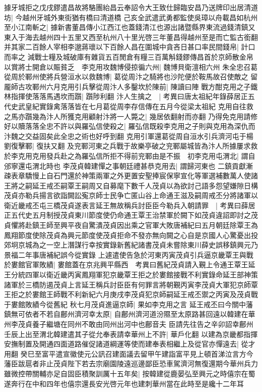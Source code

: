 據牙城拒之戊戌鏐遣昌故將駱團紿昌云奉詔令大王致仕歸臨安昌乃送牌印出居清道坊|{
	今越州牙城外東街猶有橋曰清道橋}
己亥全武遣武勇都監使吳璋以舟載昌如杭州至小江南斬之|{
	據新書董昌傳小江西江也蓋錢清江也源出諸暨縣界東流過錢清鎮又東入于海去越州四十五里又西至杭州八十里光啓三年董昌得越州至是而亡監古銜翻}
并其家二百餘人宰相李邈蔣瓌以下百餘人昌在圍城中貪吝日甚口率民間錢帛|{
	計口而率之}
減戰士糧及城破庫有雜貨五百閒倉有糧三百萬斛錢鏐傳昌首於京師散金帛以賞將士開倉以賑貧乏　李克用攻魏博侵掠徧六州|{
	魏博貝衛澶相六州}
朱全忠召葛從周於鄆州使將兵營洹水以救魏博|{
	葛從周汴之騎將也沙陀便於鞍馬故召使敵之}
留龎師古攻鄆州六月克用引兵擊從周汴人多鑿坎於陳前|{
	陳讀曰陣}
戰方酣克用之子鐵林指揮使落落馬遇坎而躓|{
	躓陟利翻}
汴人生擒之　|{
	考異曰唐太祖紀年錄薛居正五代史武皇紀實錄禽落落皆在七月葛從周李存信傳在五月今從梁太祖紀}
克用自往救之馬亦躓幾為汴人所獲克用顧射汴將一人斃之|{
	幾居依翻射而亦翻}
乃得免克用請修好以贖落落全忠不許以與羅弘信使殺之|{
	羅弘信既殺李克用之子則與克用為深仇而汴魏之交益固矣此全忠之術也好呼到翻}
克用引軍還葛從周自洹水引兵濟河屯于楊劉復擊鄆|{
	復扶又翻}
及兖鄆河東之兵戰于故樂亭破之兖鄆屬城皆為汴人所據屢求救於李克用克用發兵赴之為羅弘信所拒不得前兖鄆由是不振　初李克用屯渭北|{
	謂自邠寧還屯渭北時也}
李茂貞韓建憚之事朝廷禮甚恭克用去|{
	謂歸河東也}
二鎮貢獻漸疎表章驕慢上自石門還於神策兩軍之外更置安聖捧宸保寧宣化等軍選補數萬人使諸王將之嗣延王戒丕嗣覃王嗣周又自募麾下數千人茂貞以為欲討己語多怨望嫌隙日構茂貞亦勒兵揚言欲詣闕訟寃京師士民争亡匿山谷上命通王滋及嗣周戒丕分將諸軍以衛近畿戒丕屯三橋茂貞遂表言延王無故稱兵討臣臣今勒兵入朝請罪　|{
	考異曰薛居正五代史五月制授茂貞東川節度使仍命通王覃王治禁軍於闕下如茂貞違詔即討之茂貞懼將赴鎮王師至興平夜自驚潰茂貞因出乘之官軍大敗唐補紀曰五月朝廷除覃王為鳳翔節度使除茂貞為興元節度使茂貞拒命不發亦無向闕之心自是京國人心驚憂出投郊坰京城為之一空上潛謀行幸按實錄新舊紀諸書茂貞未嘗除東川薛史誤移鎮興元乃景福二年事唐補紀誤今從實錄}
上遽遣使告急於河東丙寅茂貞引兵逼京畿覃王與戰於婁館官軍敗績|{
	婁館蓋在京兆興平縣西　考異曰舊紀茂貞請入覲上令通王覃王延王分統四軍以衛近畿丙寅鳳翔軍犯京畿覃王拒之於婁館接戰不利實錄命延王部神策諸軍於三橋防遏茂貞上言延王稱兵討臣臣有何罪言將朝覲丙寅李茂貞大軍犯京師覃王拒之於婁館王師戰不利新紀六月庚戌李茂貞犯京師嗣延王戒丕禦之丙寅及茂貞戰于婁館敗績今從舊紀}
秋七月茂貞進逼京師|{
	果如李克用之言}
延王戒丕曰今關中藩鎮無可依者不若自鄜州濟河幸太原|{
	自鄜州濟河道汾隰至太原路甚回遠以韓建在華州李茂貞養子繼塘在同州不敢由同州出河中也鄜音夫}
臣請先往告之辛卯詔幸鄜州壬辰上出至渭北韓建遣其子從允奉表請幸華州上不許|{
	華戶化翻}
以建為京畿都指揮安撫制置及開通四面道路催促諸道綱運等使而建奉表相繼上及從官亦憚遠去|{
	從才用翻}
癸巳至富平遣宣徽使元公訊召建面議去留甲午建詣富平見上頓首涕泣言方今藩臣跋扈者非止茂貞陛下若去宗廟園陵遠巡邊鄙臣恐車駕濟河無復還期今華州兵力雖微控帶關輔亦足自固臣積聚訓厲十五年矣|{
	按韓建從鹿晏弘至興元之時僖宗在蜀遂奔行在中和四年也僖宗還長安光啓元年也建刺華州當在此時至是纔十二年耳}

